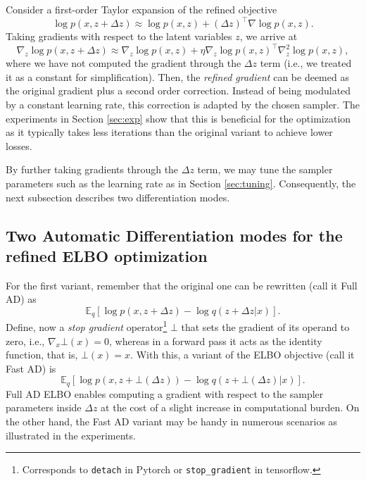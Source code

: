 Consider a first-order Taylor expansion of the refined objective 
$$
\log p(x, z + \Delta z) \approx \log p(x, z) + (\Delta z)^\intercal \nabla \log p(x, z).
$$
Taking gradients %
with respect to the latent variables $z$, we arrive at
$$
\nabla_z \log p(x, z + \Delta z) \approx \nabla_z \log p(x,z) + \eta \nabla_z \log p(x,z)^\intercal \nabla_z^2 \log p(x,z),
$$
where we have not computed the gradient through the $\Delta z$ term (i.e., we treated it as a constant for simplification). Then, the \emph{refined gradient} can be deemed as the original gradient plus a second order correction. Instead of being modulated by a constant learning rate, this correction is adapted by the chosen sampler. The experiments in Section \ref{sec:exp} 
show that this is beneficial for the optimization as it 
typically takes less iterations than the original variant to achieve lower losses. 

By further taking gradients through the $\Delta z$ term, we may tune the sampler parameters such as the learning rate as 
in Section \ref{sec:tuning}. Consequently, the next subsection describes two 
differentiation modes.


\subsection{Two Automatic Differentiation modes for the refined ELBO optimization}\label{sec:AD}

For the first variant, 
remember that the original one can be 
rewritten (call it Full AD)  as
\begin{equation}
     \mathbb{E}_q \left[ \log p(x, z + \Delta z) - \log q(z + \Delta z | x) \right].
\end{equation}
Define, now a \emph{stop gradient} operator\footnote{Corresponds to \texttt{detach} in Pytorch or \texttt{stop\_gradient} in tensorflow.}  $\bot$ that sets the gradient of its operand to zero, i.e., $\nabla_x \bot (x) = 0$, whereas in a forward pass it acts as the identity function, that is, $\bot (x) = x$. With this, a variant  of the ELBO objective (call it Fast AD) is
\begin{equation}
    \mathbb{E}_q \left[ \log p(x, z + \bot (\Delta z)) - \log q(z + \bot(\Delta z) | x) \right].
\end{equation}
 Full AD ELBO enables computing a gradient
 with respect to the sampler parameters inside $\Delta z$ at the cost of a slight increase in computational burden.
 On the other hand, the Fast AD variant may be handy in numerous scenarios
 as illustrated in the experiments.

